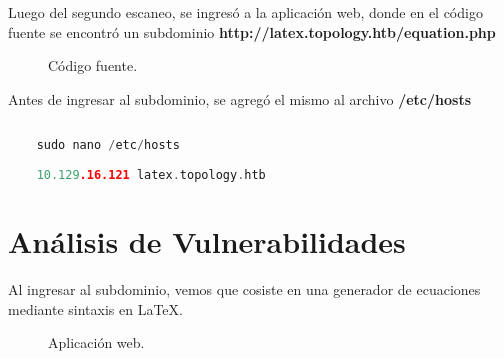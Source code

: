 \documentclass[a4paper]{article} %
\begin{document}
    \vspace{0.2cm}

    Luego del segundo escaneo, se ingresó a la aplicación web, donde en el código fuente se encontró un subdominio \textbf{http://latex.topology.htb/equation.php}

    \begin{figure}[h] %
        \begin{center}
        \setlength{\fboxsep}{0.2em} %
        \end{center}
        \captionsetup{labelfont=bf} %
        \caption{Código fuente.}
    \end{figure}

    \vspace{4cm}

    Antes de ingresar al subdominio, se agregó el mismo al archivo \textbf{/etc/hosts}

    \captionsetup[lstlisting]{labelfont=bf} %
    \begin{lstlisting}[language=c, caption=Agregando subdominio al archivo /etc/hosts, aboveskip=0.5cm]
        
    sudo nano /etc/hosts
          
    10.129.16.121 latex.topology.htb
    \end{lstlisting}

\vspace{20cm}

\section{Análisis de Vulnerabilidades}
Al ingresar al subdominio, vemos que cosiste en una generador de ecuaciones mediante sintaxis en LaTeX.

\begin{figure}[h] %
    \begin{center}
    \setlength{\fboxsep}{0.2em} %
    \end{center}
    \captionsetup{labelfont=bf} %
    \caption{Aplicación web.}
\end{figure}
\end{document}
